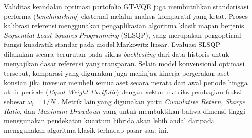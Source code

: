 Validitas keandalan optimasi portofolio GT-VQE juga membutuhkan standarisasi performa (\textit{benchmarking}) eksternal melalui analisis komparatif yang ketat. Proses kalibrasi referensi menggunakan pengaplikasian algoritma klasik mapan berjenis \textit{Sequential Least Squares Programming} (SLSQP), yang merupakan pengoptimal fungsi kuadratik standar pada model Markowitz linear. Evaluasi SLSQP dilakukan secara berurutan pada siklus \textit{backtesting} dari data historis untuk menyajikan dasar referensi yang transparan. Selain model konvensional optimasi tersebut, komparasi yang digunakan juga meninjau kinerja pergerakan aset konstan jika investor membeli semua aset secara merata dari awal periode hingga akhir periode (\textit{Equal Weight Portfolio}) dengan vektor matriks pembagian fraksi sebesar $\omega_i = 1/N$ \cite{demiguel_optimal_2009}. Metrik lain yang digunakan yaitu \textit{Cumulative Return}, \textit{Sharpe Ratio}, dan \textit{Maximum Drawdown} yang untuk membuktikan bahwa dimensi tinggi menggunakan pendekatan kuantum hibrida akan lebih andal daripada menggunakan algoritma klasik terhadap pasar saat ini.

